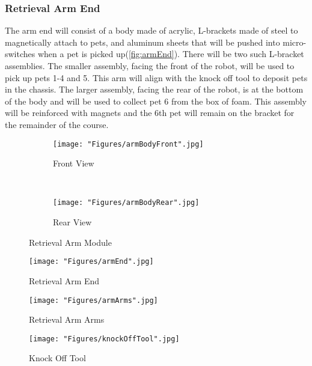 \documentclass[11pt, oneside]{article} %
\begin{document}
		\subsubsection{Retrieval Arm End}
		The arm end will consist of a body made of acrylic, L-brackets made of steel to magnetically attach to pets, and aluminum sheets that will be pushed into micro-switches when a pet is picked up(\autoref{fig:armEnd}). There will be two such L-bracket assemblies. The smaller assembly, facing the front of the robot, will be used to pick up pets 1-4 and 5. This arm will align with the knock off tool to deposit pets in the chassis. The larger assembly, facing the rear of the robot, is at the bottom of the body and will be used to collect pet 6 from the box of foam. This assembly will be reinforced with magnets and the 6th pet will remain on the bracket for the remainder of the course.
		
	\begin{figure}[h]
		\centering
		\begin{subfigure}[b]{0.4\textwidth}
			\centering
			\texttt{[image: "Figures/armBodyFront".jpg]}
			\caption{Front View}
		\end{subfigure}
		~
		\begin{subfigure}[b]{0.5\textwidth}
			\centering
			\texttt{[image: "Figures/armBodyRear".jpg]}
			\caption{Rear View}
		\end{subfigure}
		\caption[Retrieval Arm Module]{Retrieval Arm Module}
		\label{fig:armBody}
	\end{figure}
		
	\begin{figure}[h]
		\centering
		\begin{minipage}[t]{.5\textwidth}
			\centering
			\texttt{[image: "Figures/armEnd".jpg]}
			\caption[Retrieval Arm End]{Retrieval Arm End}
			\label{fig:armEnd}
		\end{minipage}%
		\begin{minipage}[t]{.5\textwidth}
			\centering
			\texttt{[image: "Figures/armArms".jpg]}
			\caption[Retrieval Arm Arms]{Retrieval Arm Arms}
			\label{fig:arm}
		\end{minipage}
	\end{figure}
	
	\begin{figure}[!h]
		\centering
		\texttt{[image: "Figures/knockOffTool".jpg]}
		\caption[Knock Off Tool]{Knock Off Tool}
		\label{fig:knockOffTool}
	\end{figure}
	
\end{document}
